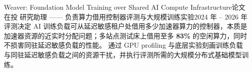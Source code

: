     \resumeSubheading
      {Weaver: Foundation Model Training over Shared AI Compute Infrastructure}{论文在投}
      {研究助理 —— 负责算力借用控制器评测与大规模训练实验}{2024 年 -- 2026 年}
      \resumeItemListStart
          {评测决定 AI 训练负载可从延迟敏感租户处借用多少加速器算力的控制器，本质是加速器资源的近实时分配问题；多站点测试床上借用至多 \textbf{83\%} 的空闲算力，同时不损害同驻延迟敏感负载的性能。}
          {通过 GPU profiling 与底层实验刻画训练负载与同驻延迟敏感负载之间的资源干扰，并执行评测所需的大规模分布式基础模型训练。}
      \resumeItemListEnd
